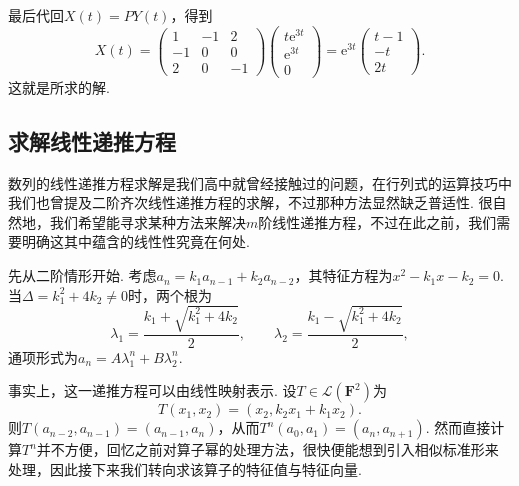 \begin{solution}
    最后代回$X(t)=PY(t)$，得到
    \[
        X(t)=\begin{pmatrix}
            1 & -1 & 2 \\ -1 & 0 & 0 \\ 2 & 0 & -1
        \end{pmatrix}\begin{pmatrix}
            t\mathrm{e}^{3t} \\ \mathrm{e}^{3t} \\ 0
        \end{pmatrix}
        =\mathrm{e}^{3t}\begin{pmatrix}
            t-1 \\ -t \\ 2t
        \end{pmatrix}.
    \]
    这就是所求的解.
\end{solution}

\subsection{求解线性递推方程}

数列的线性递推方程求解是我们高中就曾经接触过的问题，在行列式的运算技巧中我们也曾提及二阶齐次线性递推方程的求解，不过那种方法显然缺乏普适性. 很自然地，我们希望能寻求某种方法来解决$m$阶线性递推方程，不过在此之前，我们需要明确这其中蕴含的线性性究竟在何处.

先从二阶情形开始. 考虑$a_n=k_1a_{n-1}+k_2a_{n-2}$，其特征方程为$x^2-k_1x-k_2=0$. 当$\Delta=k_1^2+4k_2\neq 0$时，两个根为
\[
    \lambda_1=\frac{k_1+\sqrt{k_1^2+4k_2}}{2},\qquad
    \lambda_2=\frac{k_1-\sqrt{k_1^2+4k_2}}{2},
\]
通项形式为$a_n=A\lambda_1^n+B\lambda_2^n$.

事实上，这一递推方程可以由线性映射表示. 设$T\in\mathcal{L}(\mathbf{F}^2)$为
\[
    T(x_1,x_2)=(x_2,k_2x_1+k_1x_2).
\]
则$T(a_{n-2},a_{n-1})=(a_{n-1},a_n)$，从而$T^n(a_0,a_1)=(a_n,a_{n+1})$. 然而直接计算$T^n$并不方便，回忆之前对算子幂的处理方法，很快便能想到引入相似标准形来处理，因此接下来我们转向求该算子的特征值与特征向量.

